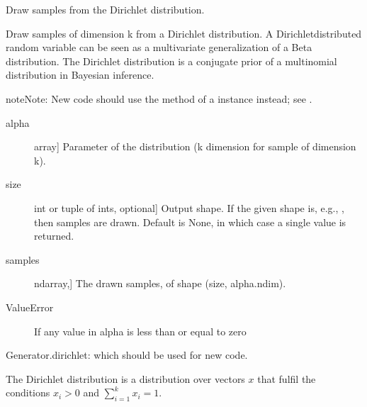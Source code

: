 \documentclass[letterpaper,10pt,english]{sphinxmanual}
\begin{document}
\begin{fulllineitems}
\label{\detokenize{infrapy.utils:infrapy.utils.ref2sac.dirichlet}}
Draw samples from the Dirichlet distribution.

Draw  samples of dimension k from a Dirichlet distribution. A
Dirichlet\sphinxhyphen{}distributed random variable can be seen as a multivariate
generalization of a Beta distribution. The Dirichlet distribution
is a conjugate prior of a multinomial distribution in Bayesian
inference.

\begin{sphinxadmonition}{note}{Note:}
New code should use the  method of a 
instance instead; see .
\end{sphinxadmonition}
\begin{description}
\item[{alpha}] \leavevmode{[}array{]}
Parameter of the distribution (k dimension for sample of
dimension k).

\item[{size}] \leavevmode{[}int or tuple of ints, optional{]}
Output shape.  If the given shape is, e.g., , then
 samples are drawn.  Default is None, in which case a
single value is returned.

\end{description}
\begin{description}
\item[{samples}] \leavevmode{[}ndarray,{]}
The drawn samples, of shape (size, alpha.ndim).

\end{description}
\begin{description}
\item[{ValueError}] \leavevmode
If any value in alpha is less than or equal to zero

\end{description}

Generator.dirichlet: which should be used for new code.

The Dirichlet distribution is a distribution over vectors
\(x\) that fulfil the conditions \(x_i>0\) and
\(\sum_{i=1}^k x_i = 1\).


\end{fulllineitems}
\end{document}
